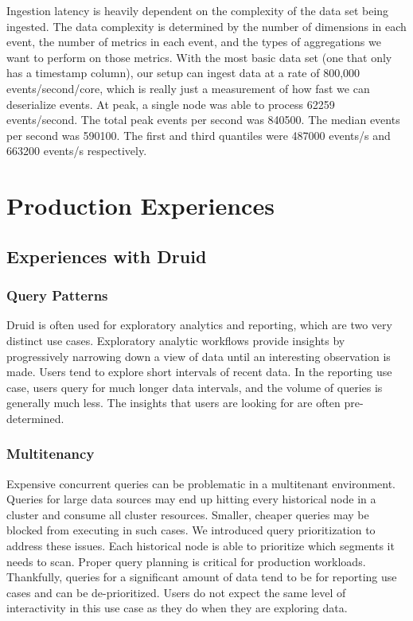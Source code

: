 \documentclass{vldb}
\begin{document}
Ingestion latency is heavily dependent on the complexity of the data set being
ingested. The data complexity is determined by the number of dimensions in each
event, the number of metrics in each event, and the types of aggregations we
want to perform on those metrics. With the most basic data set (one that only
has a timestamp column), our setup can ingest data at a rate of 800,000
events/second/core, which is really just a measurement of how fast we can
deserialize events. At peak, a single node was able to process 62259
events/second. The total peak events per second was
840500. The median events per second was 590100. The first and third quantiles
were 487000 events/s and 663200 events/s respectively. 

\section{Production Experiences}
\label{sec:experiences}

\subsection{Experiences with Druid}
\subsubsection{Query Patterns}
Druid is often used for exploratory analytics and reporting, which are two very
distinct use cases. Exploratory analytic workflows provide insights by
progressively narrowing down a view of data until an interesting observation is
made. Users tend to explore short intervals of recent data. In the reporting
use case, users query for much longer data intervals, and the volume of queries
is generally much less. The insights that users are looking for are often
pre-determined. 

\subsubsection{Multitenancy}
Expensive concurrent queries can be problematic in a multitenant environment.
Queries for large data sources may end up hitting every historical node in a
cluster and consume all cluster resources. Smaller, cheaper queries may be
blocked from executing in such cases. We introduced query prioritization to
address these issues. Each historical node is able to prioritize which segments
it needs to scan. Proper query planning is critical for production workloads.
Thankfully, queries for a significant amount of data tend to be for reporting
use cases and can be de-prioritized. Users do not expect the same level of
interactivity in this use case as they do when they are exploring data. 
\end{document}
